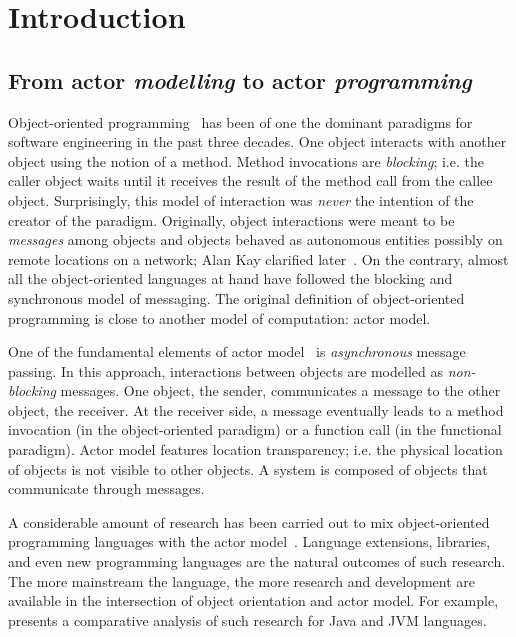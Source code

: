 
\chapter[Introduction]{Introduction}
\label{ch:intro}

\section{From actor \emph{modelling} to actor \emph{programming}}
\label{sec:intro:abs}

Object-oriented programming~\cite{booch1982object,meyer1988object} has been of one the dominant paradigms for software engineering in the past three decades.
One object interacts with another object using the notion of a method.
Method invocations are \emph{blocking}; i.e. the caller object waits until it receives the result of the method call from the callee object.
Surprisingly, this model of interaction was \emph{never} the intention of the creator of the paradigm.
Originally, object interactions were meant to be \emph{messages} among objects and objects behaved as autonomous entities possibly on remote locations on a network; Alan Kay clarified later~\cite{alank1,alank2}. 
On the contrary, almost all the object-oriented languages at hand have followed the blocking and synchronous model of messaging. 
The original definition of object-oriented programming is close to another model of computation: actor model.  

One of the fundamental elements of actor model~\cite{actors:agha,agha97} is \emph{asynchronous} message passing.
In this approach, interactions between objects are modelled as \emph{non-blocking} messages.
One object, the sender, communicates a message to the other object, the receiver.
At the receiver side, a message eventually leads to a method invocation (in the object-oriented paradigm) or a function call (in the functional paradigm).
Actor model features location transparency; i.e. the physical location of objects is not visible to other objects.
A system is composed of objects that communicate through messages.

A considerable amount of research has been carried out to mix object-oriented programming languages with the actor model~\cite{philippsen2000survey}. 
Language extensions, libraries, and even new programming languages are the natural outcomes of such research.
The more mainstream the language, the more research and development are available in the intersection of object orientation and actor model.
For example, \cite{actor_frameworks_jvm:agha} presents a comparative analysis of such research for Java and JVM languages.

